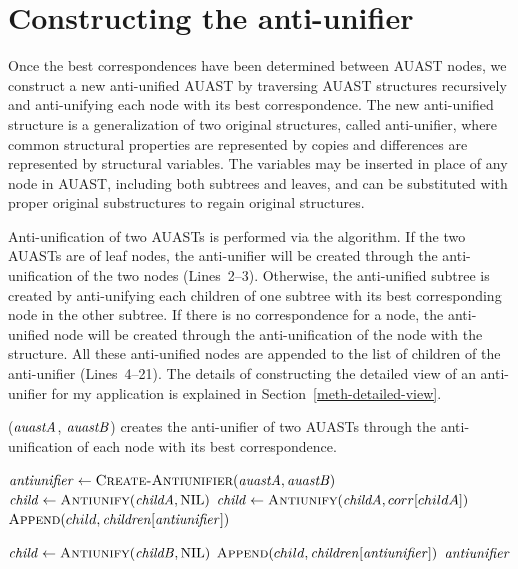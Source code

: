\section{Constructing the anti-unifier} \label{meth-antiUnifier}
Once the best correspondences have been determined between AUAST nodes, we construct a new anti-unified AUAST by traversing AUAST structures recursively and anti-unifying each node with its best correspondence. The new anti-unified structure is a generalization of two original structures, called anti-unifier, where common structural properties are represented by copies and differences are represented by structural variables. The variables may be inserted in place of any node in AUAST, including both subtrees and leaves, and can be substituted with proper original substructures to regain original structures.


Anti-unification of two AUASTs is performed via the  algorithm.
If the two AUASTs are of leaf nodes, the anti-unifier will be created through the anti-unification of the two nodes (Lines~2--3). Otherwise, the anti-unified subtree is created by anti-unifying each children of one subtree with its best corresponding node in the other subtree. If there is no correspondence for a node, the anti-unified node will be created through the anti-unification of the node with the \NIL{} structure. All these anti-unified nodes are appended to the list of children of the anti-unifier (Lines~4--21). The details of constructing the detailed view of an anti-unifier for my application is explained in Section~\ref{meth-detailed-view}.


\begin{algorithm}
 \caption{($\mathit{auastA}$, $\mathit{auastB}$) creates the anti-unifier of two AUASTs through the anti-unification of each node with its best correspondence.}
  \label{AntiUnify}
  \begin{algorithmic}[1]
\AntiUnify
{}
  \State $\mathit{antiunifier} \gets   \textsc{Create-Antiunifier}(\mathit{auastA},\mathit{auastB})$
  \State $\mathit{child} \gets   \textsc{Antiunify}(\mathit{childA},\textrm{NIL})$
\Else	
 \State $\mathit{child} \gets   \textsc{Antiunify}(\mathit{childA},corr[childA])$
\EndIf
\State $\textsc{Append}(child,\mathit{children[antiunifier]})$
\EndFor
	\EndIf	

  \State $\mathit{child} \gets   \textsc{Antiunify}(\mathit{childB},\textrm{NIL})$
\EndIf
\State $\textsc{Append}(child,\mathit{children[antiunifier]})$
\EndFor
  \EndIf
\Return $\mathit{antiunifier}$
\end{algorithmic}
\end{algorithm}



